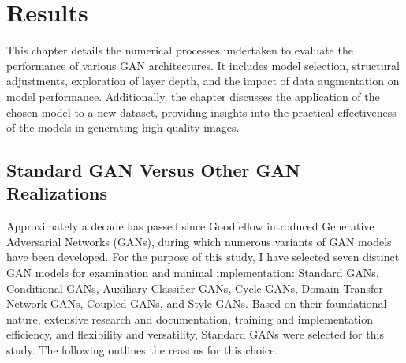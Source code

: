 \chapter{Results}
\label{Experiments}

This chapter details the numerical processes undertaken to evaluate the performance of various GAN 
architectures. It includes model selection, structural adjustments, exploration of layer depth, and the 
impact of data augmentation on model performance. Additionally, the chapter discusses the application of 
the chosen model to a new dataset, providing insights into the practical effectiveness of the models 
in generating high-quality images. 


\section{Standard GAN Versus Other GAN Realizations}
Approximately a decade has passed since Goodfellow introduced Generative Adversarial Networks (GANs), 
during which numerous variants of GAN models have been developed. For the purpose of this study, 
I have selected seven distinct GAN models for examination and minimal implementation: Standard GANs, 
Conditional GANs, Auxiliary Classifier GANs, Cycle GANs, Domain Transfer Network GANs, Coupled GANs, 
and Style GANs. Based on their foundational nature, extensive research and documentation, training and 
implementation efficiency, and flexibility and versatility, Standard GANs were selected for this study. 
The following outlines the reasons for this choice.


